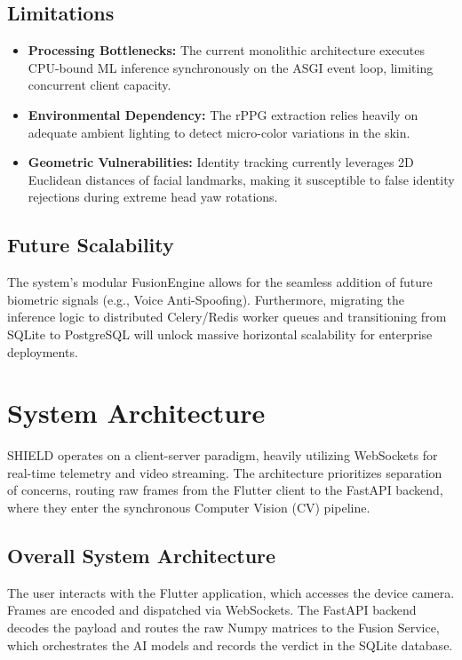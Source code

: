 \documentclass[12pt, a4paper]{report}
\begin{document}
\section{Limitations}
\begin{itemize}
    \item \textbf{Processing Bottlenecks:} The current monolithic architecture executes CPU-bound ML inference synchronously on the ASGI event loop, limiting concurrent client capacity.
    \item \textbf{Environmental Dependency:} The rPPG extraction relies heavily on adequate ambient lighting to detect micro-color variations in the skin. 
    \item \textbf{Geometric Vulnerabilities:} Identity tracking currently leverages 2D Euclidean distances of facial landmarks, making it susceptible to false identity rejections during extreme head yaw rotations.
\end{itemize}

\section{Future Scalability}
The system's modular FusionEngine allows for the seamless addition of future biometric signals (e.g., Voice Anti-Spoofing). Furthermore, migrating the inference logic to distributed Celery/Redis worker queues and transitioning from SQLite to PostgreSQL will unlock massive horizontal scalability for enterprise deployments.

\fi
\chapter{System Architecture}

SHIELD operates on a client-server paradigm, heavily utilizing WebSockets for real-time telemetry and video streaming. The architecture prioritizes separation of concerns, routing raw frames from the Flutter client to the FastAPI backend, where they enter the synchronous Computer Vision (CV) pipeline.

\section{Overall System Architecture}
The user interacts with the Flutter application, which accesses the device camera. Frames are encoded and dispatched via WebSockets. The FastAPI backend decodes the payload and routes the raw Numpy matrices to the Fusion Service, which orchestrates the AI models and records the verdict in the SQLite database.
\end{document}
